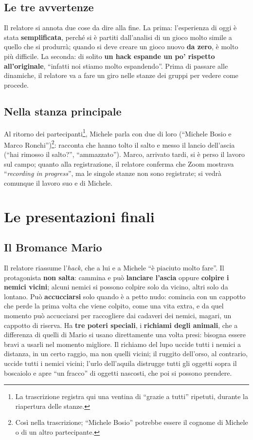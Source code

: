 \subsection{Le tre avvertenze}

Il relatore si annota due cose da dire alla fine. La prima: l'esperienza di oggi è
stata \textbf{semplificata}, perché si è partiti dall'analisi di un gioco molto
simile a quello che si produrrà; quando si deve creare un gioco nuovo \textbf{da
zero}, è molto più difficile. La seconda: di solito \textbf{un hack espande un
po' rispetto all'originale}, ``infatti noi stiamo molto espandendo''. Prima di
passare alle dinamiche, il relatore va a fare un giro nelle stanze dei gruppi per
vedere come procede.

\subsection{Nella stanza principale}

Al ritorno dei partecipanti\footnote{La trascrizione registra qui una ventina di
``grazie a tutti'' ripetuti, durante la riapertura delle stanze.}, Michele parla con
due di loro (``Michele Bosio e Marco Ronchi'')\footnote{Così nella trascrizione;
``Michele Bosio'' potrebbe essere il cognome di Michele o di un altro partecipante.}:
racconta che hanno tolto il salto e messo il lancio dell'ascia (``hai rimosso il
salto?'', ``ammazzato''). Marco, arrivato tardi, si è perso il lavoro sul campo;
quanto alla registrazione, il relatore conferma che Zoom mostrava ``\emph{recording
in progress}'', ma le singole stanze non sono registrate; si vedrà comunque il lavoro
suo e di Michele.

\section{Le presentazioni finali}
\label{z7:sec:presentazioni}

\subsection{Il Bromance Mario}

Il relatore riassume l'\emph{hack}, che a lui e a Michele ``è piaciuto molto
fare''. Il protagonista \textbf{non salta}: cammina e può \textbf{lanciare
l'ascia} oppure \textbf{colpire i nemici vicini}; alcuni nemici si possono colpire
solo da vicino, altri solo da lontano. Può \textbf{accucciarsi} solo quando è a
petto nudo: comincia con un cappotto che perde la prima volta che viene colpito,
come una vita extra, e da quel momento può accucciarsi per raccogliere dai cadaveri
dei nemici, magari, un cappotto di riserva. Ha \textbf{tre poteri speciali}, i
\textbf{richiami degli animali}, che a differenza di quelli di Mario si usano
direttamente una volta presi: bisogna essere bravi a usarli nel momento migliore.
Il richiamo del lupo uccide tutti i nemici a distanza, in un certo raggio, ma non
quelli vicini; il ruggito dell'orso, al contrario, uccide tutti i nemici vicini;
l'urlo dell'aquila distrugge tutti gli oggetti sopra il boscaiolo e apre ``un fracco''
di oggetti nascosti, che poi si possono prendere.

